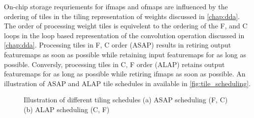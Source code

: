 On-chip storage requriements for ifmaps and ofmaps are influenced by the
ordering of tiles in the tiling representation of weights discussed in
\autoref{chap:dda}. The order of processing weight tiles is equivelent to the
ordering of the F, and C loops in the loop based representation of the
convolution operation discussed in \autoref{chap:dda}. Processing tiles in F, C
order (ASAP) results in retiring output featuremaps as soon as possible while retaining
input featuremaps for as long as possible. Conversly, processing tiles in C, F
order (ALAP) retains output featuremaps for as long as possible while retiring ifmaps
as soon as possible. An illustration of ASAP and ALAP tile schedules in
available in \autoref{fig:tile_scheduling}. 

\begin{figure}
    \centering
    \hspace{0.1cm} 
    \caption{Illustration of different tiling schedules (a) ASAP scheduling (F, C)  (b) ALAP scheduling (C, F)}
    \label{fig:tile_scheduling}
\end{figure}

